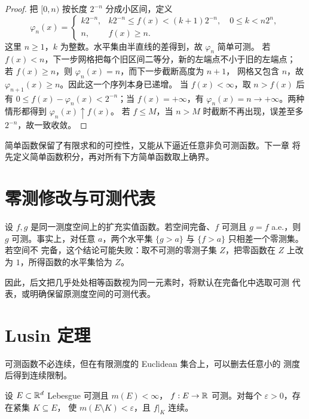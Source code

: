 \begin{proof}
把 $[0,n)$ 按长度 $2^{-n}$ 分成小区间，定义
\[
 \varphi_n(x)=
 \begin{cases}
  k2^{-n},&k2^{-n}\le f(x)<(k+1)2^{-n},\quad
             0\le k<n2^n,\\
  n,&f(x)\ge n.
 \end{cases}
\]
这里 $n\ge1$，$k$ 为整数。水平集由半直线的差得到，故 $\varphi_n$ 简单可测。
若 $f(x)<n$，下一步网格把每个旧区间二等分，新的左端点不小于旧的左端点；
若 $f(x)\ge n$，则 $\varphi_n(x)=n$，而下一步截断高度为 $n+1$，
网格又包含 $n$，故 $\varphi_{n+1}(x)\ge n$。因此这一个序列本身已递增。
当 $f(x)<\infty$，取 $n>f(x)$ 后有
$0\le f(x)-\varphi_n(x)<2^{-n}$；当 $f(x)=+\infty$，有
$\varphi_n(x)=n\to+\infty$。两种情形都得到 $\varphi_n(x)\uparrow f(x)$。
若 $f\le M$，当 $n>M$ 时截断不再出现，误差至多 $2^{-n}$，故一致收敛。
\end{proof}

简单函数保留了有限求和的可控性，又能从下逼近任意非负可测函数。下一章
将先定义简单函数积分，再对所有下方简单函数取上确界。

\section{零测修改与可测代表}

设 $f,g$ 是同一测度空间上的扩充实值函数。若空间完备、$f$ 可测且
$g=f$ a.e.，则 $g$ 可测。事实上，对任意
$a$，两个水平集 $\{g>a\}$ 与 $\{f>a\}$ 只相差一个零测集。若空间不
完备，这个结论可能失败：取不可测的零测子集 $Z$，把零函数在 $Z$ 上改为
$1$，所得函数的水平集恰为 $Z$。

因此，后文把几乎处处相等函数视为同一元素时，将默认在完备化中选取可测
代表，或明确保留原测度空间的可测代表。

\section{Lusin 定理}

可测函数不必连续，但在有限测度的 Euclidean 集合上，可以删去任意小的
测度后得到连续限制。

\begin{theorem}[Lusin]
\label{thm:lusin}
设 $E\subset\mathbb{R}^d$ Lebesgue 可测且 $m(E)<\infty$，
$f:E\to\mathbb{R}$ 可测。对每个 $\varepsilon>0$，存在紧集 $K\subseteq E$，
使 $m(E\setminus K)<\varepsilon$，且 $f|_K$ 连续。
\end{theorem}

